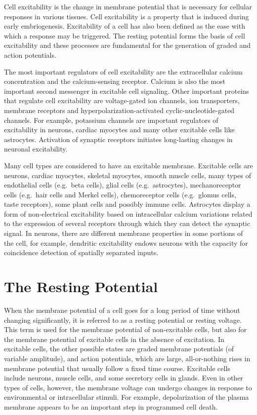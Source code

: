 \documentclass[]{book}
\begin{document}
Cell excitability is the change in membrane potential that is necessary for cellular responses in various tissues. Cell excitability is a property that is induced during early embriogenesis. Excitability of a cell has also been defined as the ease with which a response may be triggered. The resting potential forms the basis of cell excitability and these processes are fundamental for the generation of graded and action potentials.

The most important regulators of cell excitability are the extracellular calcium concentration and the calcium-sensing receptor. Calcium is also the most important second messenger in excitable cell signaling. Other important proteins that regulate cell excitability are voltage-gated ion channels, ion transporters, membrane receptors and hyperpolarization-activated cyclic-nucleotide-gated channels. For example, potassium channels are important regulators of excitability in neurons, cardiac myocytes and many other excitable cells like astrocytes. Activation of synaptic receptors initiates long-lasting changes in neuronal excitability.

Many cell types are considered to have an excitable membrane. Excitable cells are neurons, cardiac myocytes, skeletal myocytes, smooth muscle cells, many types of endothelial cells (e.g.~beta cells), glial cells (e.g.~astrocytes), mechanoreceptor cells (e.g.~hair cells and Merkel cells), chemoreceptor cells (e.g.~glomus cells, taste receptors), some plant cells and possibly immune cells. Astrocytes display a form of non-electrical excitability based on intracellular calcium variations related to the expression of several receptors through which they can detect the synaptic signal. In neurons, there are different membrane properties in some portions of the cell, for example, dendritic excitability endows neurons with the capacity for coincidence detection of spatially separated inputs.

\hypertarget{the-resting-potential}{%
\section{The Resting Potential}\label{the-resting-potential}}

When the membrane potential of a cell goes for a long period of time without changing significantly, it is referred to as a resting potential or resting voltage. This term is used for the membrane potential of non-excitable cells, but also for the membrane potential of excitable cells in the absence of excitation. In excitable cells, the other possible states are graded membrane potentials (of variable amplitude), and action potentials, which are large, all-or-nothing rises in membrane potential that usually follow a fixed time course. Excitable cells include neurons, muscle cells, and some secretory cells in glands. Even in other types of cells, however, the membrane voltage can undergo changes in response to environmental or intracellular stimuli. For example, depolarization of the plasma membrane appears to be an important step in programmed cell death.
\end{document}
